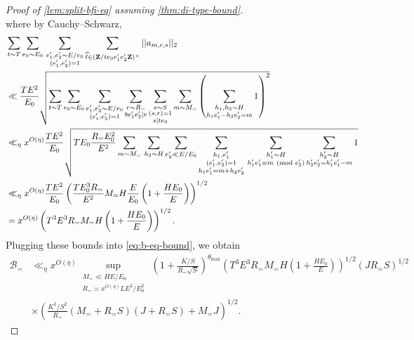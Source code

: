 \documentclass[reqno,11pt]{amsart}
\theoremstyle{definition}
\theoremstyle{remark}
\numberwithin{equation}{section}
\newcommand{\Z}{\mathbf{Z}}
\newcommand{\mB}{\mathcal{B}}
\renewcommand{\hat}{\widehat}
\renewcommand{\pmod}[1]{\ (\textnormal{mod } #1)}
\begin{document}
\begin{proof}[Proof of \cref{lem:split-bfi-eq} assuming \cref{thm:di-type-bound}]
\[\]
where by Cauchy--Schwarz,
\[
\begin{aligned}
    &\sum_{t \sim T} \sum_{e_0 \sim E_0}\,
    \sum_{\substack{e_1', e_2' \sim E/e_0 \\ (e_1', e_2') = 1}} \sum_{\hat{\ell} \in (\Z/te_0e_1'e_2'\Z)^\times} ||a_{m,r,s}||_2
    \\
    &\ll 
    \frac{TE^2}{E_0}
    \sqrt{\sum_{t \sim T} \sum_{e_0 \sim E_0} \sum_{\substack{e_1', e_2' \sim E/e_0 \\ (e_1', e_2') = 1}} \sum_{\substack{r \sim R_= \\ b e_1'e_2' \mid r}}
    \sum_{\substack{s \sim S \\ (s, r) = 1 \\ s \mid te_0}} \sum_{m \sim M_=} \left(\sum_{\substack{h_1, h_2 \sim H \\ h_1e_1' - h_2e_2' = m}} 1\right)^2 }
    \\
    &\ll_\eta x^{O(\eta)}
    \frac{TE^2}{E_0}
    \sqrt{ 
    TE_0 \frac{R_= E_0^2}{E^2} \sum_{m \sim M_{=}}\,
    \sum_{h_2 \sim H}
    \sum_{e_2' \ll E/E_0}
    \sum_{\substack{h_1, e_1' \\ (e_1', e_2') = 1 \\ h_1e_1' = m + h_2e_2'}}\,
    \sum_{\substack{h_1' \sim H \\ h_1'e_1' \equiv m \pmod{e_2'}}}
    \sum_{\substack{h_2' \sim H \\ h_2'e_2' = h_1'e_1' - m}} 1
    }
    \\
    &\ll_\eta x^{O(\eta)}
    \frac{TE^2}{E_0} \left(\frac{TE_0^3 R_=}{E^2} M_= H\frac{E}{E_0}\left(1 + \frac{HE_0}{E}\right)\right)^{1/2}
    \\
    &=
    x^{O(\eta)}
    \left(T^3 E^3 R_= M_= H\left(1 + \frac{H E_0}{E}\right)\right)^{1/2}.
\end{aligned}
\]
Plugging these bounds into \cref{eq:b-eq-bound}, we obtain
\[
\begin{aligned}
    \mB_{=} 
    &\ll_\eta x^{O(\eta)}
    \sup_{\substack{M_= \ll HE/E_0 \\ R_= \asymp x^{O(\eta)} LE^2/E_0^2}}\,
    \left(1 + \frac{K/S}{R_= \sqrt{S}}\right)^{\theta_{\max}} \left(T^3 E^3 R_= M_= H\left(1 + \frac{H E_0}{E}\right)\right)^{1/2} \left(J R_= S\right)^{1/2}
    \\ 
    &\times 
    \left(\frac{K^2/S^2}{R_=} \left(M_{=} + R_=S\right)\left(J + R_=S\right) + M_{=}J \right)^{1/2}.
\end{aligned}
\]


\end{proof}
\end{document}
